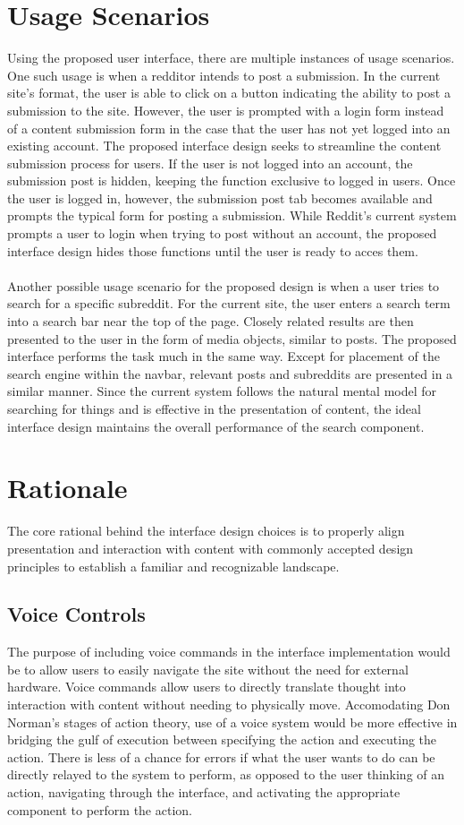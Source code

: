 \documentclass{article}
\begin{document}
\section{Usage Scenarios} Using the proposed user interface, there are multiple instances of usage scenarios. One such usage is when a redditor intends to post a submission. In the current site's format, the user is able to click on a button indicating the ability to post a submission to the site. However, the user is prompted with a login form instead of a content submission form in the case that the user has not yet logged into an existing account. The proposed interface design seeks to streamline the content submission process for users. If the user is not logged into an account, the submission post is hidden, keeping the function exclusive to logged in users. Once the user is logged in, however, the submission post tab becomes available and prompts the typical form for posting a submission. While Reddit's current system prompts a user to login when trying to post without an account, the proposed interface design hides those functions until the user is ready to acces them.\\
\\
\indent Another possible usage scenario for the proposed design is when a user tries to search for a specific subreddit. For the current site, the user enters a search term into a search bar near the top of the page. Closely related results are then presented to the user in the form of media objects, similar to posts. The proposed interface performs the task much in the same way. Except for placement of the search engine within the navbar, relevant posts and subreddits are presented in a similar manner. Since the current system follows the natural mental model for searching for things and is effective in the presentation of content, the ideal interface design maintains the overall performance of the search component.

\section{Rationale} The core rational behind the interface design choices is to properly align presentation and interaction with content with commonly accepted design principles to establish a familiar and recognizable landscape.

\subsection{Voice Controls} The purpose of including voice commands in the interface implementation would be to allow users to easily navigate the site without the need for external hardware. Voice commands allow users to directly translate thought into interaction with content without needing to physically move. Accomodating Don Norman's stages of action theory, use of a voice system would be more effective in bridging the gulf of execution between specifying the action and executing the action. There is less of a chance for errors if what the user wants to do can be directly relayed to the system to perform, as opposed to the user thinking of an action, navigating through the interface, and activating the appropriate component to perform the action.
\end{document}
